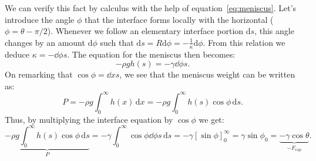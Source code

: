 We can verify this fact by calculus with the help of equation~\eqref{eq:meniscus}. Let's introduce the angle $\phi$ that the interface forms locally with the horizontal ($\phi = \theta - \pi/2$). Whenever we follow an elementary interface portion $\mathrm ds$, this angle changes by an amount $\mathrm d \phi$ such that $\mathrm ds = R \mathrm d \phi = -\frac{1}{\kappa} \mathrm d \phi$. From this relation we deduce $\kappa = -\dd{\phi}{s}$. The equation for the meniscus then becomes:
\begin{equation}
-\rho g h(s) = - \gamma \dd{\phi}{s}.
\end{equation}
On remarking that $\cos\phi = \dd{x}{s}$, we see that the meniscus weight can be written as:
\begin{equation}
P = - \rho g \int_0^\infty h(x) \, \mathrm dx = - \rho g \int_0^\infty h(s) \cos \phi \, \mathrm ds.
\end{equation}
Thus, by multiplying the interface equation by $\cos \phi$ we get:
\begin{equation}
\underbrace{-\rho g \int_0^\infty h(s)\cos \phi\,\mathrm ds}_P = - \gamma \int_0^\infty \cos\phi \dd{\phi}{s}\, \mathrm ds = - \gamma \left[ \sin \phi \right]_0^\infty = \gamma \sin \phi_0 = \underbrace{-\gamma \cos \theta}_{-F_\text{cap}}.
\end{equation}


